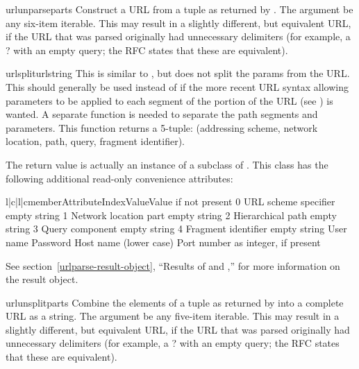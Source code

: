 \begin{funcdesc}{urlunparse}{parts}
Construct a URL from a tuple as returned by .
The  argument be any six-item iterable.
This may result in a slightly different, but equivalent URL, if the
URL that was parsed originally had unnecessary delimiters (for example,
a ? with an empty query; the RFC states that these are equivalent).
\end{funcdesc}

\begin{funcdesc}{urlsplit}{urlstring}
This is similar to , but does not split the
params from the URL.  This should generally be used instead of
 if the more recent URL syntax allowing
parameters to be applied to each segment of the  portion of
the URL (see ) is wanted.  A separate function is needed to
separate the path segments and parameters.  This function returns a
5-tuple: (addressing scheme, network location, path, query, fragment
identifier).

The return value is actually an instance of a subclass of
.  This class has the following additional read-only
convenience attributes:

\begin{tableiv}{l|c|l|c}{member}{Attribute}{Index}{Value}{Value if not present}
     {0} {URL scheme specifier}   {empty string}
     {1} {Network location part}  {empty string}
       {2} {Hierarchical path}      {empty string}
      {3} {Query component}        {empty string}
   {4} {Fragment identifier}    {empty string}
   { } {User name}              {}
   { } {Password}               {}
   { } {Host name (lower case)} {}
       { } {Port number as integer, if present} {}
\end{tableiv}

See section~\ref{urlparse-result-object}, ``Results of
 and ,'' for more
information on the result object.

\end{funcdesc}

\begin{funcdesc}{urlunsplit}{parts}
Combine the elements of a tuple as returned by 
into a complete URL as a string.
The  argument be any five-item iterable.
This may result in a slightly different, but equivalent URL, if the
URL that was parsed originally had unnecessary delimiters (for example,
a ? with an empty query; the RFC states that these are equivalent).
\end{funcdesc}

